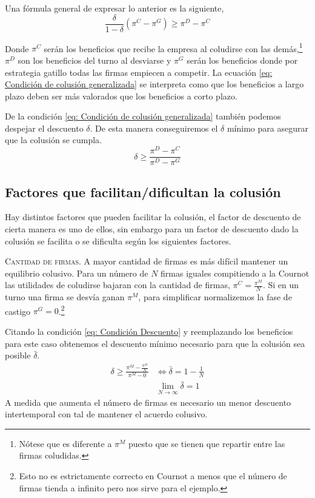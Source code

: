 Una fórmula general de expresar lo anterior es la siguiente,
\begin{equation}
    \frac{\delta }{1-\delta} (\pi ^C - \pi^{G}) \geq \pi ^D- \pi^C \label{eq: Condición de colusión generalizada}
\end{equation}

Donde $\pi^C$ serán los beneficios que recibe la empresa al coludirse con las demás,\footnote{Nótese que es diferente a $\pi^M$ puesto que se tienen que repartir entre las firmas coludidas.} $\pi^D$ son los beneficios del turno al desviarse y $\pi^G$ serán los beneficios donde por estrategia gatillo todas las firmas empiecen a competir. La ecuación \ref{eq: Condición de colusión generalizada} se interpreta como que los beneficios a largo plazo deben ser más valorados que los beneficios a corto plazo. 

De la condición \ref{eq: Condición de colusión generalizada} también podemos despejar el descuento $\delta$. De esta manera conseguiremos el $\delta$ mínimo para asegurar que la colusión se cumpla.
\begin{equation}
    \delta \geq \frac{\pi^D - \pi ^C}{\pi^D- \pi^G} \label{eq: Condición Descuento}
\end{equation}

\subsection{Factores que facilitan/dificultan la colusión}

Hay distintos factores que pueden facilitar la colusión, el factor de descuento de cierta manera es uno de ellos, sin embargo para un factor de descuento dado la colusión se facilita o se dificulta según los siguientes factores.

\textsc{Cantidad de firmas}. A mayor cantidad de firmas es más difícil mantener un equilibrio colusivo. Para un número de $N$ firmas iguales compitiendo a la Cournot las utilidades de coludirse bajaran con la cantidad de firmas, $\pi^C = \frac{\pi^M}{N}$. Si en un turno una firma se desvía ganan $\pi^M$, para simplificar normalizemos la fase de castigo $\pi^G = 0$.\footnote{Esto no es estrictamente correcto en Cournot a menos que el número de firmas tienda a infinito pero nos sirve para el ejemplo.}

Citando la condición \ref{eq: Condición Descuento} y reemplazando los beneficios para este caso obtenemos el descuento mínimo necesario para que la colusión sea posible $\bar{\delta}$. 
\begin{align*}
    \delta \geq \frac{\pi^M - \frac{\pi^M}{N}}{\pi ^M - 0} &\Longleftrightarrow \bar{\delta} = 1 - \frac{1}{N} \\
    &\lim_{N\to \infty} \bar{\delta} = 1
\end{align*}
A medida que aumenta el número de firmas es necesario un menor descuento intertemporal con tal de mantener el acuerdo colusivo.

